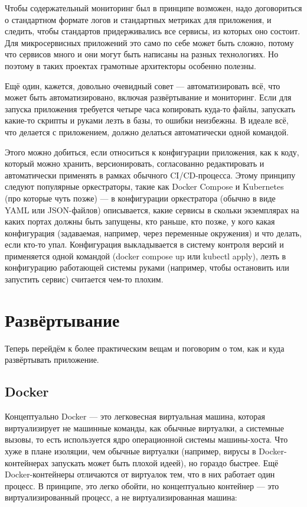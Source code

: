 \documentclass{../../text-style}
\begin{document}
Чтобы содержательный мониторинг был в принципе возможен, надо договориться о стандартном формате логов и стандартных метриках для приложения, и следить, чтобы стандартов придерживались все сервисы, из которых оно состоит. Для микросервисных приложений это само по себе может быть сложно, потому что сервисов много и они могут быть написаны на разных технологиях. Но поэтому в таких проектах грамотные архитекторы особенно полезны.

Ещё один, кажется, довольно очевидный совет --- автоматизировать всё, что может быть автоматизировано, включая развёртывание и мониторинг. Если для запуска приложения требуется четыре часа копировать куда-то файлы, запускать какие-то скрипты и руками лезть в базы, то ошибки неизбежны. В идеале всё, что делается с приложением, должно делаться автоматически одной командой.

Этого можно добиться, если относиться к конфигурации приложения, как к коду, который можно хранить, версионировать, согласованно редактировать и автоматически применять в рамках обычного CI/CD-процесса. Этому принципу следуют популярные оркестраторы, такие как Docker Compose и Kubernetes (про которые чуть позже) --- в конфигурации оркестратора (обычно в виде YAML или JSON-файлов) описывается, какие сервисы в скольки экземплярах на каких портах должны быть запущены, кто раньше, кто позже, у кого какая конфигурация (задаваемая, например, через переменные окружения) и что делать, если кто-то упал. Конфигурация выкладывается в систему контроля версий и применяется одной командой (docker compose up или kubectl apply), лезть в конфигурацию работающей системы руками (например, чтобы остановить или запустить сервис) считается чем-то плохим.

\section{Развёртывание}

Теперь перейдём к более практическим вещам и поговорим о том, как и куда развёртывать приложение.

\subsection{Docker}

Концептуально Docker --- это легковесная виртуальная машина, которая виртуализирует не машинные команды, как обычные виртуалки, а системные вызовы, то есть используется ядро операционной системы машины-хоста. Что хуже в плане изоляции, чем обычные виртуалки (например, вирусы в Docker-контейнерах запускать может быть плохой идеей), но гораздо быстрее. Ещё Docker-контейнеры отличаются от виртуалок тем, что в них работает один процесс. В принципе, это легко обойти, но концептуально контейнер --- это виртуализированный процесс, а не виртуализированная машина:
\end{document}
